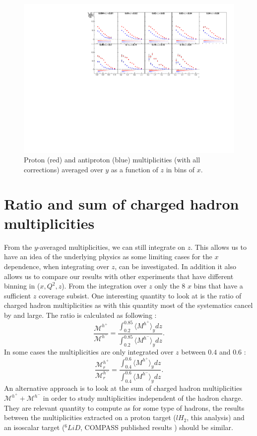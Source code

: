 \begin{figure}[!h]
  \centering
	\includegraphics[scale=0.85]{./gfx/pyavg.pdf}
	\caption{Proton (red) and antiproton (blue) multiplicities (with all corrections) averaged over $y$ as a function of $z$ in bins of $x$.}
	\label{pic:mpyavg}
\end{figure}

\newpage

\section{Ratio and sum of charged hadron multiplicities}

From the $y$-averaged multiplicities, we can still integrate on $z$. This allows us to have an idea of the underlying physics as some limiting cases for the $x$ dependence, when integrating over $z$, can be investigated. In addition it also allows us to compare our results with other experiments that have different binning in ($x,Q^2,z$). From the integration over $z$ only the 8 $x$ bins that have a sufficient $z$ coverage subsist. One interesting quantity to look at is the ratio of charged hadron multiplicities as with this quantity most of the systematics cancel by and large. The ratio is calculated as following :
%
\begin{equation}
  \frac{\mathscr{M}^{h^+}}{\mathscr{M}^{h^-}} = \frac{\int_{0.2}^{0.85} \langle M^{h^+} \rangle_y dz}{\int_{0.2}^{0.85} \langle M^{h^-} \rangle_y dz}.
\end{equation}
%
In some cases the multiplicities are only integrated over $z$ between $0.4$ and $0.6$ :
%
\begin{equation}
  \frac{\mathscr{M}^{h^+}_{r}}{\mathscr{M}^{h^-}_{r}} = \frac{\int_{0.4}^{0.6} \langle M^{h^+} \rangle_y dz}{\int_{0.4}^{0.6} \langle M^{h^-} \rangle_y dz}.
\end{equation}
%
An alternative approach is to look at the sum of charged hadron multiplicities $\mathscr{M}^{h^+}+\mathscr{M}^{h^-}$ in order to study multiplicities independent of the hadron charge. They are relevant quantity to compute as for some type of hadrons, the results between the multiplicities extracted on a proton target ($lH_2$, this analysis) and an isoscalar target ($^6LiD$, COMPASS published results \cite{COMPASS2006Pi,COMPASS2006K}) should be similar.

